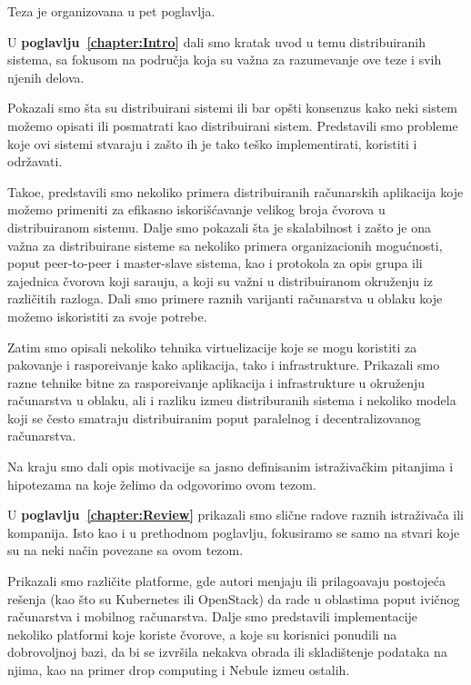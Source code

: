 Teza je organizovana u pet poglavlja.

U \textbf{poglavlju~\ref{chapter:Intro}} dali smo kratak uvod u temu distribuiranih sistema, sa fokusom na podru\v cja koja su va\v zna za razumevanje ove teze i svih njenih delova.

Pokazali smo \v sta su distribuirani sistemi ili bar op\v sti konsenzus kako neki sistem mo\v zemo opisati ili posmatrati kao distribuirani sistem. Predstavili smo probleme koje ovi sistemi stvaraju i za\v sto ih je tako te\v sko implementirati, koristiti i odr\v zavati.

Tako\dj e, predstavili smo nekoliko primera distribuiranih ra\v cunarskih aplikacija koje mo\v zemo primeniti za efikasno iskori\v s\'cavanje velikog broja \v cvorova u distribuiranom sistemu. Dalje smo pokazali \v sta je skalabilnost i za\v sto je ona va\v zna za distribuirane sisteme sa nekoliko primera organizacionih mogu\'cnosti, poput peer-to-peer i master-slave sistema, kao i protokola za opis grupa ili zajednica \v cvorova koji sara\dj uju, a koji su va\v zni u distribuiranom okru\v zenju iz razli\v citih razloga. Dali smo primere raznih varijanti ra\v cunarstva u oblaku koje mo\v zemo iskoristiti za svoje potrebe.

Zatim smo opisali nekoliko tehnika virtuelizacije koje se mogu koristiti za pakovanje i raspore\dj ivanje kako aplikacija, tako i infrastrukture. Prikazali smo razne tehnike bitne za raspore\dj ivanje aplikacija i infrastrukture u okru\v zenju ra\v cunarstva u oblaku, ali i razliku izme\dj u distriburanih sistema i nekoliko modela koji se \v cesto smatraju distribuiranim poput paralelnog i decentralizovanog ra\v cunarstva.

Na kraju smo dali opis motivacije sa jasno definisanim istra\v ziva\v ckim pitanjima i hipotezama na koje \v zelimo da odgovorimo ovom tezom.

U \textbf{poglavlju~\ref{chapter:Review}} prikazali smo sli\v cne radove raznih istra\v ziva\v ca ili kompanija. Isto kao i u prethodnom poglavlju, fokusiramo se samo na stvari koje su na neki na\v cin povezane sa ovom tezom.

Prikazali smo razli\v cite platforme, gde autori menjaju ili prilago\dj avaju postoje\'ca re\v senja (kao \v sto su Kubernetes ili OpenStack) da rade u oblastima poput ivi\v cnog ra\v cunarstva i mobilnog ra\v cunarstva. Dalje smo predstavili implementacije nekoliko platformi koje koriste \v cvorove, a koje su korisnici ponudili na dobrovoljnoj bazi, da bi se izvr\v sila nekakva obrada ili skladi\v stenje podataka na njima, kao na primer drop computing i Nebule izme\dj u ostalih.

